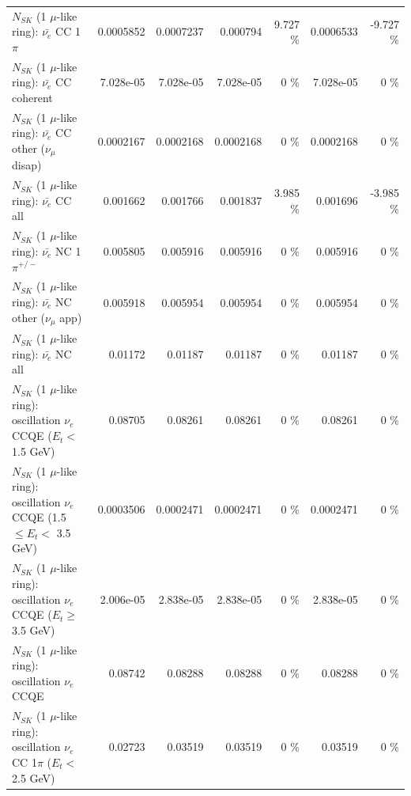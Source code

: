 \begin{table}
\begin{tabular}{| l | r | r | r  r | r  r |}
\hline
                           $N_{SK}$ (1 $\mu$-like ring): $\bar{\nu_e}$ CC 1$\pi$ &       0.0005852 &       0.0007237 &        0.000794 &    9.727 \%  &       0.0006533 &   -9.727 \%  \\ 
                         $N_{SK}$ (1 $\mu$-like ring): $\bar{\nu_e}$ CC coherent &       7.028e-05 &       7.028e-05 &       7.028e-05 &        0 \%  &       7.028e-05 &        0 \%  \\ 
          $N_{SK}$ (1 $\mu$-like ring): $\bar{\nu_e}$ CC other ($\nu_\mu$ disap) &       0.0002167 &       0.0002168 &       0.0002168 &        0 \%  &       0.0002168 &        0 \%  \\ 
                            $N_{SK}$ (1 $\mu$-like ring): $\bar{\nu_{e}}$ CC all &        0.001662 &        0.001766 &        0.001837 &    3.985 \%  &        0.001696 &   -3.985 \%  \\ 
\hline
                     $N_{SK}$ (1 $\mu$-like ring): $\bar{\nu_e}$ NC 1$\pi^{+/-}$ &        0.005805 &        0.005916 &        0.005916 &        0 \%  &        0.005916 &        0 \%  \\ 
            $N_{SK}$ (1 $\mu$-like ring): $\bar{\nu_e}$ NC other ($\nu_\mu$ app) &        0.005918 &        0.005954 &        0.005954 &        0 \%  &        0.005954 &        0 \%  \\ 
                            $N_{SK}$ (1 $\mu$-like ring): $\bar{\nu_{e}}$ NC all &         0.01172 &         0.01187 &         0.01187 &        0 \%  &         0.01187 &        0 \%  \\ 
\hline
\hline
\hline
      $N_{SK}$ (1 $\mu$-like ring): oscillation $\nu_e$ CCQE ($E_{t} <$ 1.5 GeV) &         0.08705 &         0.08261 &         0.08261 &        0 \%  &         0.08261 &        0 \%  \\ 
$N_{SK}$ (1 $\mu$-like ring): oscillation $\nu_e$ CCQE (1.5 $\leq E_{t} <$ 3.5 GeV) &       0.0003506 &       0.0002471 &       0.0002471 &        0 \%  &       0.0002471 &        0 \%  \\ 
   $N_{SK}$ (1 $\mu$-like ring): oscillation $\nu_e$ CCQE ($E_{t} \geq$ 3.5 GeV) &       2.006e-05 &       2.838e-05 &       2.838e-05 &        0 \%  &       2.838e-05 &        0 \%  \\ 
\hline
                          $N_{SK}$ (1 $\mu$-like ring): oscillation $\nu_e$ CCQE &         0.08742 &         0.08288 &         0.08288 &        0 \%  &         0.08288 &        0 \%  \\ 
\hline
 $N_{SK}$ (1 $\mu$-like ring): oscillation $\nu_e$ CC 1$\pi$ ($E_{t} <$ 2.5 GeV) &         0.02723 &         0.03519 &         0.03519 &        0 \%  &         0.03519 &        0 \%  \\ 

\end{tabular}
\end{table}
